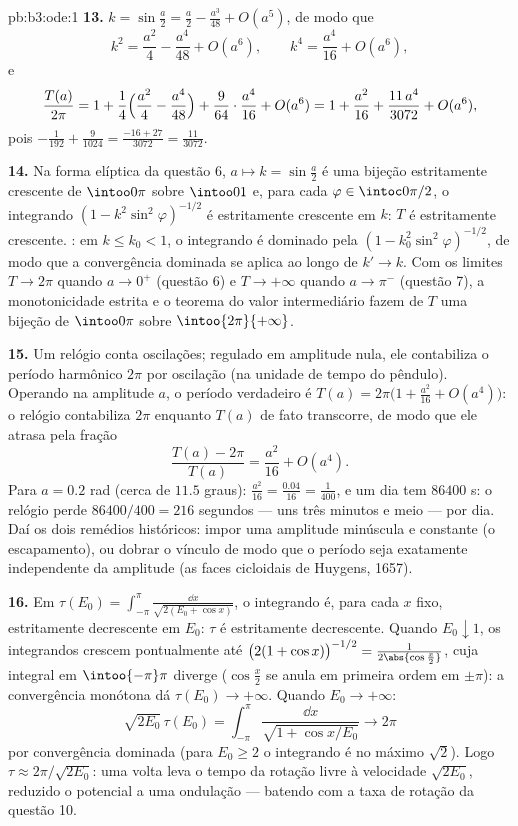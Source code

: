 \begin{solution}{pb:b3:ode:1}
\textbf{13.} $k = \sin\frac a2 = \frac a2 - \frac{a^3}{48} +
O(a^5)$, de modo que
\[
k^2 = \frac{a^2}4 - \frac{a^4}{48} + O(a^6),
\qquad
k^4 = \frac{a^4}{16} + O(a^6) ,
\]
e
\[
\frac{T(a)}{2\pi} = 1 + \frac14\Bigl(\frac{a^2}4 -
\frac{a^4}{48}\Bigr) + \frac9{64}\cdot\frac{a^4}{16} +
O(a^6)
= 1 + \frac{a^2}{16} + \frac{11\,a^4}{3072} + O(a^6) ,
\]
pois $-\frac1{192} + \frac9{1024} = \frac{-16 + 27}{3072}
= \frac{11}{3072}$.

\textbf{14.} Na forma elíptica da questão 6, $a \mapsto
k = \sin\frac a2$ é uma bijeção  estritamente crescente
de $\intoo0\pi$ sobre $\intoo01$ e, para cada
$\varphi \in \intoc0{\pi/2}$, o integrando $(1 -
k^2\sin^2\varphi)^{-1/2}$ é estritamente crescente em $k$: $T$
é estritamente crescente. : em $k \leq k_0 < 1$, o
integrando é dominado pela  $(1 -
k_0^2\sin^2\varphi)^{-1/2}$, de modo que a convergência dominada
se aplica ao longo de $k' \to k$. Com os limites $T \to 2\pi$ quando $a
\to 0^+$ (questão 6) e $T \to +\infty$ quando $a \to \pi^-$
(questão 7), a monotonicidade estrita e o teorema do valor
intermediário fazem de $T$ uma bijeção de $\intoo0\pi$ sobre
$\intoo{2\pi}{+\infty}$.

\textbf{15.} Um relógio conta oscilações; regulado em amplitude
nula, ele contabiliza o período harmônico $2\pi$ por oscilação (na
unidade de tempo do pêndulo). Operando na amplitude $a$, o período
verdadeiro é $T(a) = 2\pi\bigl(1 + \frac{a^2}{16} +
O(a^4)\bigr)$: o relógio contabiliza $2\pi$ enquanto $T(a)$ de fato
transcorre, de modo que ele atrasa pela fração
\[
\frac{T(a) - 2\pi}{T(a)} = \frac{a^2}{16} + O(a^4) .
\]
Para $a = 0.2$ rad (cerca de $11.5$ graus): $\frac{a^2}{16} =
\frac{0.04}{16} = \frac1{400}$, e um dia tem $86400$ s: o
relógio perde $86400/400 = 216$ segundos --- uns três minutos e
meio --- por dia. Daí os dois remédios históricos:
impor uma amplitude minúscula e constante (o escapamento), ou dobrar
o vínculo de modo que o período seja exatamente independente da
amplitude (as faces cicloidais de Huygens, 1657).

\textbf{16.} Em $\tau(E_0) = \int_{-\pi}^{\pi}\frac{\dd
x}{\sqrt{2(E_0 + \cos x)}}$, o integrando é, para cada
$x$ fixo, estritamente decrescente em $E_0$: $\tau$ é estritamente
decrescente. Quando $E_0 \downarrow 1$, os integrandos crescem
pontualmente até $\bigl(2(1 + \cos x)\bigr)^{-1/2} =
\frac1{2\abs{\cos\frac x2}}$, cuja integral em
$\intoo{-\pi}\pi$ diverge ($\cos\frac x2$ se anula em primeira
ordem em $\pm\pi$): a convergência monótona dá $\tau(E_0)
\to +\infty$. Quando $E_0 \to +\infty$:
\[
\sqrt{2E_0}\,\tau(E_0) = \int_{-\pi}^{\pi}
\frac{\dd x}{\sqrt{1 + \cos x/E_0}} \longrightarrow 2\pi
\]
por convergência dominada (para $E_0 \geq 2$ o integrando é
no máximo $\sqrt2$). Logo $\tau \approx 2\pi/\sqrt{2E_0}$: uma
volta leva o tempo da rotação livre à velocidade $\sqrt{2E_0}$,
reduzido o potencial a uma ondulação --- batendo com a taxa de rotação
da questão 10.


\end{solution}
